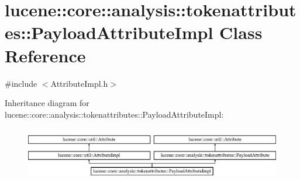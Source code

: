 \hypertarget{classlucene_1_1core_1_1analysis_1_1tokenattributes_1_1PayloadAttributeImpl}{}\section{lucene\+:\+:core\+:\+:analysis\+:\+:tokenattributes\+:\+:Payload\+Attribute\+Impl Class Reference}
\label{classlucene_1_1core_1_1analysis_1_1tokenattributes_1_1PayloadAttributeImpl}


{\ttfamily \#include $<$Attribute\+Impl.\+h$>$}

Inheritance diagram for lucene\+:\+:core\+:\+:analysis\+:\+:tokenattributes\+:\+:Payload\+Attribute\+Impl\+:\begin{figure}[H]
\begin{center}
\leavevmode
\includegraphics[height=2.400000cm]{classlucene_1_1core_1_1analysis_1_1tokenattributes_1_1PayloadAttributeImpl}
\end{center}
\end{figure}
